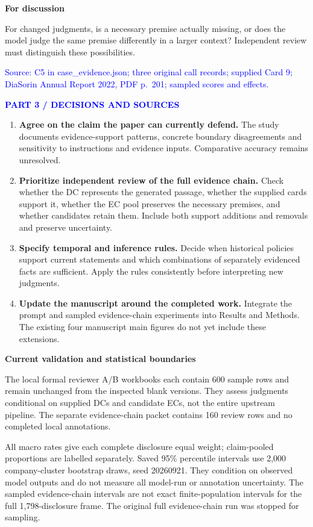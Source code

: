 \documentclass[11pt,a4paper]{article}
\newcommand{\pagetitle}[2]{\textcolor{blue}{\small\bfseries #1}\par\vspace{2pt}{\LARGE\bfseries #2\par}\vspace{5pt}}
\newcommand{\subhead}[1]{\vspace{5pt}\textbf{#1}\par}
\newcommand{\source}[1]{{\footnotesize\textcolor{blue}{Source: #1}\par}}
\newcommand{\question}[1]{\par\vspace{5pt}\noindent\colorbox{cream}{\parbox{\dimexpr\linewidth-2\fboxsep\relax}{\vspace{4pt}\textcolor{amber}{\textbf{For discussion}}\par #1\vspace{4pt}}}\par}
\begin{document}
\question{For changed judgments, is a necessary premise actually missing, or does the model judge the same premise differently in a larger context? Independent review must distinguish these possibilities.}
\source{C5 in case\_evidence.json; three original call records; supplied Card 9; DiaSorin Annual Report 2022, PDF p.~201; sampled scores and effects.}

\newpage
\pagetitle{PART 3 / DECISIONS AND SOURCES}{What should the meeting decide?}

\begin{enumerate}
\item \textbf{Agree on the claim the paper can currently defend.} The study documents evidence-support patterns, concrete boundary disagreements and sensitivity to instructions and evidence inputs. Comparative accuracy remains unresolved.
\item \textbf{Prioritize independent review of the full evidence chain.} Check whether the DC represents the generated passage, whether the supplied cards support it, whether the EC pool preserves the necessary premises, and whether candidates retain them. Include both support additions and removals and preserve uncertainty.
\item \textbf{Specify temporal and inference rules.} Decide when historical policies support current statements and which combinations of separately evidenced facts are sufficient. Apply the rules consistently before interpreting new judgments.
\item \textbf{Update the manuscript around the completed work.} Integrate the prompt and sampled evidence-chain experiments into Results and Methods. The existing four manuscript main figures do not yet include these extensions.
\end{enumerate}

\subhead{Current validation and statistical boundaries}
The local formal reviewer A/B workbooks each contain 600 sample rows and remain unchanged from the inspected blank versions. They assess judgments conditional on supplied DCs and candidate ECs, not the entire upstream pipeline. The separate evidence-chain packet contains 160 review rows and no completed local annotations.

All macro rates give each complete disclosure equal weight; claim-pooled proportions are labelled separately. Saved 95\% percentile intervals use 2,000 company-cluster bootstrap draws, seed 20260921. They condition on observed model outputs and do not measure all model-run or annotation uncertainty. The sampled evidence-chain intervals are not exact finite-population intervals for the full 1,798-disclosure frame. The original full evidence-chain run was stopped for sampling.
\end{document}
